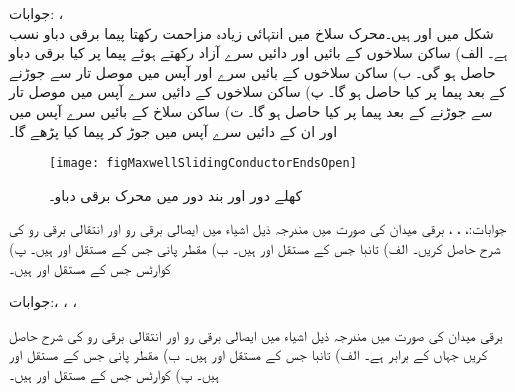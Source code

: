 جوابات: ، \\ 
شکل  میں  اور  ہیں۔محرک سلاخ میں انتہائی زیادہ مزاحمت رکھتا پیما برقی دباو  نسب ہے۔ الف) ساکن سلاخوں کے بائیں اور دائیں  سرے آزاد رکھتے ہوئے پیما پر کیا برقی دباو حاصل ہو گی۔ ب) ساکن سلاخوں کے بائیں سرے  اور  آپس میں موصل تار سے جوڑنے کے بعد پیما پر کیا حاصل ہو گا۔ پ) ساکن سلاخوں کے دائیں سرے آپس میں موصل تار سے جوڑنے کے بعد پیما پر کیا حاصل ہو گا۔ ت) ساکن سلاخ کے بائیں سرے آپس میں اور ان کے دائیں سرے آپس میں جوڑ کر پیما کیا پڑھے گا۔

\begin{figure}
\centering
\texttt{[image: figMaxwellSlidingConductorEndsOpen]}
\caption{کھلے دور اور بند دور میں محرک برقی دباو۔}
\label{شکل_میکس_ویل_سوال_کھلا_دور_بند_دور}
\end{figure}

جوابات:، ،  ، 
برقی میدان  کی صورت میں مندرجہ ذیل اشیاء میں ایصالی برقی رو اور انتقالی برقی رو کی شرح حاصل کریں۔ الف) تانبا جس کے مستقل  اور  ہیں۔ ب) مقطر پانی جس کے مستقل  اور  ہیں۔ پ) کوارٹس جس کے مستقل  اور  ہیں۔

جوابات:، ، ، 

برقی میدان  کی صورت میں مندرجہ ذیل اشیاء میں ایصالی برقی رو اور انتقالی برقی رو کی شرح حاصل کریں جہاں  کے برابر ہے۔ الف) تانبا جس کے مستقل  اور  ہیں۔ ب) مقطر پانی جس کے مستقل  اور  ہیں۔ پ) کوارٹس جس کے مستقل  اور  ہیں۔

